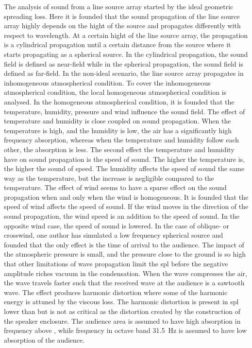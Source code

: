 The analysis of sound from a line source array started by the ideal geometric spreading loss. Here it is founded that the sound propagation of the line source array highly depends on the hight of the source and propagates differently with respect to wavelength. At a certain hight of the line source array, the propagation is a cylindrical propagation until a certain distance from the source where it starts propagating as a spherical source. In the cylindrical propagation, the sound field is defined as near-field while in the spherical propagation, the sound field is defined as far-field. In the non-ideal scenario, the line source array propagates in inhomogeneous atmospherical condition. To cover the inhomogeneous atmospherical condition, the local homogeneous atmospherical condition is analysed. In the homogeneous atmospherical condition, it is founded that the temperature, humidity, pressure and wind influence the sound field. The effect of temperature and humidity is close coupled on sound propagation. When the temperature is high, and the humidity is low, the air has a significantly high frequency absorption, whereas when the temperature and humidity follow each other, the absorption is less. The second effect the temperature and humidity have on sound propagation is the speed of sound. The higher the temperature is, the higher the sound of speed. The humidity affects the speed of sound the same way as the temperature, but the increase is negligible compared to the temperature. The effect of wind seems to have a sparse effect on the sound propagation when and only when the wind is homogeneous. It is founded that the speed of wind affects the speed of sound. If the wind moves in the direction of the sound propagation, the wind speed is an addition to the speed of sound. In the opposite wind case, the speed of sound is lowered. In the case of oblique- or crosswind, one author has simulated a low frequency spherical source and founded that the only effect is the time of arrival to the audience.  The impact of the atmospheric pressure is small, and the pressure close to the ground is so high that other limitations of wave propagation limit the \gls{spl} before the negative amplitude riches vacuum in the condensation. When the wave compresses the air, the wave travels faster such that the received wave at the audience is a sawtooth wave. The effect produces harmonic distortion where some of the harmonic energy is attuned by the viscous loss. The harmonic distortion is present in \gls{spl} lower than  but is not as critical as the distortion created by the construction of the speaker enclosure. 
The audience area is assumed to have high absorption in frequency above , while frequency in octave band \SI{31.5}{\hertz} is assumed to have low absorption of the audience. 


